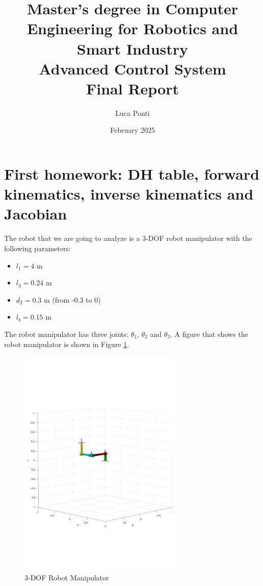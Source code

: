 \documentclass{article}
\title{%
Master's degree in Computer Engineering for Robotics and Smart Industry \\
\vspace{0.5cm}
\textbf{Advanced Control System  \\Final Report}}
\author{Luca Ponti}
\date{February 2025}
\begin{document}
\maketitle
\newpage
\tableofcontents
\newpage

\section{First homework: DH table, forward kinematics, inverse kinematics and Jacobian}
\justify


The robot that we are going to analyze is a 3-DOF robot manipulator with the following parameters:
\begin{itemize}
    \item $l_1 = 4$ m
    \item $l_3 = 0.24$ m
    \item $d_2 = 0.3$ m (from -0.3 to 0)
    \item $l_b = 0.15$ m
\end{itemize}

The robot manipulator has three joints: $\theta_1$, $\theta_2$ and $\theta_3$.
A figure that shows the robot manipulator is shown in Figure \ref{fig:robot_manipulator}.

\begin{figure}[H]
    \centering
    \includegraphics[width=0.70\textwidth]{figures/robot.pdf}
    \caption{3-DOF Robot Manipulator}
    \label{fig:robot_manipulator}
\end{figure}
\end{document}
